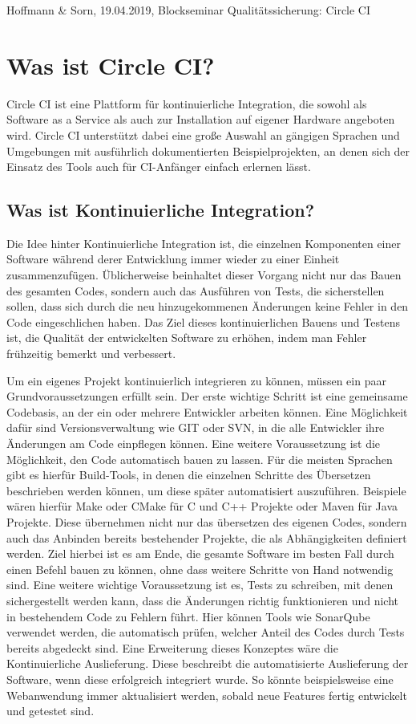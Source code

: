 \documentclass[11pt]{article}
\begin{document}
Hoffmann \& Sorn, 19.04.2019, Blockseminar Qualitätssicherung: Circle CI

\section {Was ist Circle CI?}

Circle CI ist eine Plattform für kontinuierliche Integration, die sowohl als Software as a Service als auch zur Installation auf eigener Hardware angeboten wird. Circle CI unterstützt dabei eine große Auswahl an gängigen Sprachen und Umgebungen mit ausführlich dokumentierten Beispielprojekten, an denen sich der Einsatz des Tools auch für CI-Anfänger einfach erlernen lässt.

\subsection {Was ist Kontinuierliche Integration?}

Die Idee hinter Kontinuierliche Integration ist, die einzelnen Komponenten einer Software während derer Entwicklung immer wieder zu einer Einheit zusammenzufügen. Üblicherweise beinhaltet dieser Vorgang nicht nur das Bauen des gesamten Codes, sondern auch das Ausführen von Tests, die sicherstellen sollen, dass sich durch die neu hinzugekommenen Änderungen keine Fehler in den Code eingeschlichen haben. Das Ziel dieses kontinuierlichen Bauens und Testens ist, die Qualität der entwickelten Software zu erhöhen, indem man Fehler frühzeitig bemerkt und verbessert.

Um ein eigenes Projekt kontinuierlich integrieren zu können, müssen ein paar Grundvoraussetzungen erfüllt sein. Der erste wichtige Schritt ist eine gemeinsame Codebasis, an der ein oder mehrere Entwickler arbeiten können. Eine Möglichkeit dafür sind Versionsverwaltung wie GIT oder SVN, in die alle Entwickler ihre Änderungen am Code einpflegen können. Eine weitere Voraussetzung ist die Möglichkeit, den Code automatisch bauen zu lassen. Für die meisten Sprachen gibt es hierfür Build-Tools, in denen die einzelnen Schritte des Übersetzen beschrieben werden können, um diese später automatisiert auszuführen. Beispiele wären hierfür Make oder CMake für C und C++ Projekte oder Maven für Java Projekte. Diese übernehmen nicht nur das übersetzen des eigenen Codes, sondern auch das Anbinden bereits bestehender Projekte, die als Abhängigkeiten definiert werden. Ziel hierbei ist es am Ende, die gesamte Software im besten Fall durch einen Befehl bauen zu können, ohne dass weitere Schritte von Hand notwendig sind. Eine weitere wichtige Voraussetzung ist es, Tests zu schreiben, mit denen sichergestellt werden kann, dass die Änderungen richtig funktionieren und nicht in bestehendem Code zu Fehlern führt. Hier können Tools wie SonarQube verwendet werden, die automatisch prüfen, welcher Anteil des Codes durch Tests bereits abgedeckt sind. Eine Erweiterung dieses Konzeptes wäre die Kontinuierliche Auslieferung. Diese beschreibt die automatisierte Auslieferung der Software, wenn diese erfolgreich integriert wurde. So könnte beispielsweise eine Webanwendung immer aktualisiert werden, sobald neue Features fertig entwickelt und getestet sind.
\end{document}
